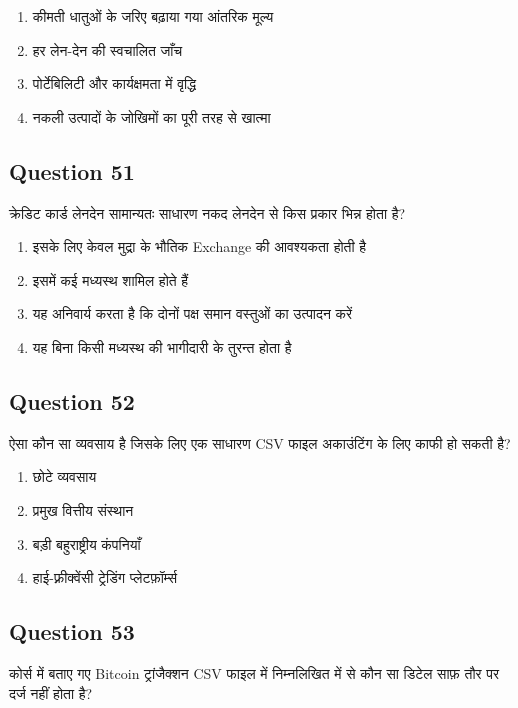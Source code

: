 \documentclass[12pt,a4paper]{article}
\begin{document}
\begin{enumerate}[label=\Alph*., leftmargin=*]
\item कीमती धातुओं के जरिए बढ़ाया गया आंतरिक मूल्य
\item हर लेन-देन की स्वचालित जाँच
\item पोर्टेबिलिटी और कार्यक्षमता में वृद्धि
\item नकली उत्पादों के जोखिमों का पूरी तरह से खात्मा
\end{enumerate}

\bigskip


\subsection*{Question 51}
क्रेडिट कार्ड लेनदेन सामान्यतः साधारण नकद लेनदेन से किस प्रकार भिन्न होता है?

\begin{enumerate}[label=\Alph*., leftmargin=*]
\item इसके लिए केवल मुद्रा के भौतिक Exchange की आवश्यकता होती है
\item इसमें कई मध्यस्थ शामिल होते हैं
\item यह अनिवार्य करता है कि दोनों पक्ष समान वस्तुओं का उत्पादन करें
\item यह बिना किसी मध्यस्थ की भागीदारी के तुरन्त होता है
\end{enumerate}

\bigskip


\subsection*{Question 52}
ऐसा कौन सा व्यवसाय है जिसके लिए एक साधारण CSV फाइल अकाउंटिंग के लिए काफी हो सकती है?

\begin{enumerate}[label=\Alph*., leftmargin=*]
\item छोटे व्यवसाय
\item प्रमुख वित्तीय संस्थान
\item बड़ी बहुराष्ट्रीय कंपनियाँ
\item हाई-फ़्रीक्वेंसी ट्रेडिंग प्लेटफ़ॉर्म्स
\end{enumerate}

\bigskip


\subsection*{Question 53}
कोर्स में बताए गए Bitcoin ट्रांजैक्शन CSV फाइल में निम्नलिखित में से कौन सा डिटेल साफ़ तौर पर दर्ज नहीं होता है?
\end{document}
